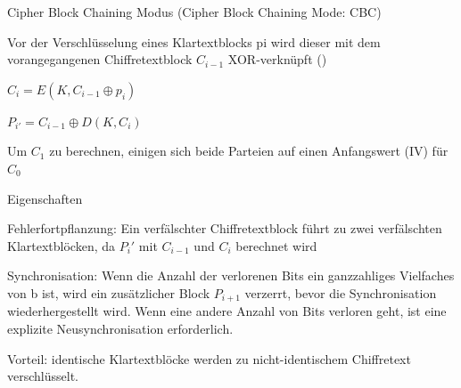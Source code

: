 \documentclass[a4paper]{article}
\begin{document}
\begin{multicols}{3}
      Cipher Block Chaining Modus (Cipher Block Chaining Mode: CBC)
      \begin{itemize*}
            \item Vor der Verschlüsselung eines Klartextblocks pi wird dieser mit dem vorangegangenen Chiffretextblock $C_{i-1}$ XOR-verknüpft ()
            \begin{itemize*}
                  \item $C_i = E(K, C_{i-1} \oplus p_i)$
                  \item $P_{i'} = C_{i-1} \oplus D(K, C_i)$
                  \item Um $C_1$ zu berechnen, einigen sich beide Parteien auf einen Anfangswert (IV) für $C_0$
            \end{itemize*}
            \item Eigenschaften
            \begin{itemize*}
                  \item Fehlerfortpflanzung: Ein verfälschter Chiffretextblock führt zu zwei verfälschten Klartextblöcken, da $P_i'$ mit $C_{i-1}$ und $C_i$ berechnet wird
                  \item Synchronisation: Wenn die Anzahl der verlorenen Bits ein ganzzahliges Vielfaches von b ist, wird ein zusätzlicher Block $P_{i+1}$ verzerrt, bevor die Synchronisation wiederhergestellt wird. Wenn eine andere Anzahl von Bits verloren geht, ist eine explizite Neusynchronisation erforderlich.
                  \item Vorteil: identische Klartextblöcke werden zu nicht-identischem Chiffretext verschlüsselt.
            \end{itemize*}
      \end{itemize*}


\end{multicols}
\end{document}
